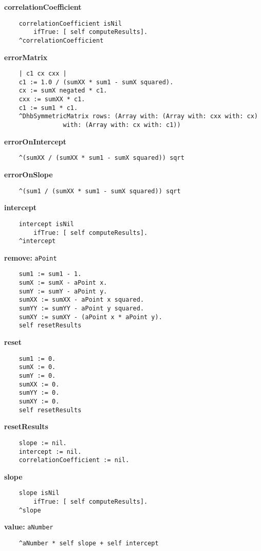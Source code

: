 {\bf correlationCoefficient}
\begin{verbatim}
    correlationCoefficient isNil
        ifTrue: [ self computeResults].
    ^correlationCoefficient

\end{verbatim}
{\bf errorMatrix}
\begin{verbatim}
    | c1 cx cxx |
    c1 := 1.0 / (sumXX * sum1 - sumX squared).
    cx := sumX negated * c1.
    cxx := sumXX * c1.
    c1 := sum1 * c1.
    ^DhbSymmetricMatrix rows: (Array with: (Array with: cxx with: cx)
                with: (Array with: cx with: c1))

\end{verbatim}
{\bf errorOnIntercept}
\begin{verbatim}
    ^(sumXX / (sumXX * sum1 - sumX squared)) sqrt

\end{verbatim}
{\bf errorOnSlope}
\begin{verbatim}
    ^(sum1 / (sumXX * sum1 - sumX squared)) sqrt

\end{verbatim}
{\bf intercept}
\begin{verbatim}
    intercept isNil
        ifTrue: [ self computeResults].
    ^intercept

\end{verbatim}
{\bf remove:} {\tt aPoint}
\begin{verbatim}
    sum1 := sum1 - 1.
    sumX := sumX - aPoint x.
    sumY := sumY - aPoint y.
    sumXX := sumXX - aPoint x squared.
    sumYY := sumYY - aPoint y squared.
    sumXY := sumXY - (aPoint x * aPoint y).
    self resetResults

\end{verbatim}
{\bf reset}
\begin{verbatim}
    sum1 := 0.
    sumX := 0.
    sumY := 0.
    sumXX := 0.
    sumYY := 0.
    sumXY := 0.
    self resetResults

\end{verbatim}
{\bf resetResults}
\begin{verbatim}
    slope := nil.
    intercept := nil.
    correlationCoefficient := nil.

\end{verbatim}
{\bf slope}
\begin{verbatim}
    slope isNil
        ifTrue: [ self computeResults].
    ^slope

\end{verbatim}
{\bf value:} {\tt aNumber}
\begin{verbatim}
    ^aNumber * self slope + self intercept

\end{verbatim}


